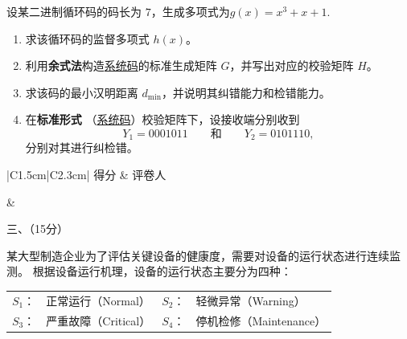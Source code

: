 \documentclass[UTF8,a4paper,12pt]{ctexart}
\begin{document}
\vspace{1.2em}

\noindent
设某二进制循环码的码长为 $7$，生成多项式为$g(x)=x^3+x+1$.

\begin{enumerate}[label=\arabic*., leftmargin=2.2em]
    \item 求该循环码的监督多项式 $h(x)$。

    \item 利用\textbf{余式法}构造\underline{系统码}的标准生成矩阵 $G$，并写出对应的校验矩阵 $H$。

    \item 求该码的最小汉明距离 $d_{\min}$，并说明其纠错能力和检错能力。

    \item 在\textbf{标准形式} （\underline{系统码}）校验矩阵下，设接收端分别收到
    \[
    Y_1=0001011
    \qquad\text{和}\qquad
    Y_2=0101110,
    \]
    分别对其进行纠检错。
\end{enumerate}

\newpage


\vspace{2.8em}

\noindent
\begin{minipage}[t]{0.25\textwidth}
\renewcommand{\arraystretch}{1.5}
\begin{tabular}{|C{1.5cm}|C{2.3cm}|}
\hline
得分 & 评卷人 \\
\hline
\rule{0pt}{0.8cm}&  \\
\hline
\end{tabular}
\end{minipage}
\begin{minipage}[t]{0.72\textwidth}
\vspace{1.0cm}
\begin{center}
{\heiti 三、（15分）}
\end{center}
\end{minipage}

\vspace{1.2em}

\noindent
某大型制造企业为了评估关键设备的健康度，需要对设备的运行状态进行连续监测。
根据设备运行机理，设备的运行状态主要分为四种：

\begin{center}
\renewcommand{\arraystretch}{1.4}
\begin{tabular}{@{}ll@{\qquad}ll@{}}
$S_1$： & 正常运行（Normal）
&
$S_2$： & 轻微异常（Warning）
\\
$S_3$： & 严重故障（Critical）
&
$S_4$： & 停机检修（Maintenance）
\end{tabular}
\end{center}
\end{document}
